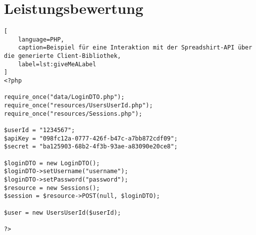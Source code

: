 \section{Leistungsbewertung}
\label{sec:performance_measurement}

\begin{lstlisting}[
    language=PHP,
    caption=Beispiel für eine Interaktion mit der Spreadshirt-API über die generierte Client-Bibliothek,
    label=lst:giveMeALabel
]
<?php

require_once("data/LoginDTO.php");
require_once("resources/UsersUserId.php");
require_once("resources/Sessions.php");

$userId = "1234567";
$apiKey = "098fc12a-0777-426f-b47c-a7bb872cdf09";
$secret = "ba125903-68b2-4f3b-93ae-a83090e20ce8";

$loginDTO = new LoginDTO();
$loginDTO->setUsername("username");
$loginDTO->setPassword("password");
$resource = new Sessions();
$session = $resource->POST(null, $loginDTO);

$user = new UsersUserId($userId);

?>
\end{lstlisting}

